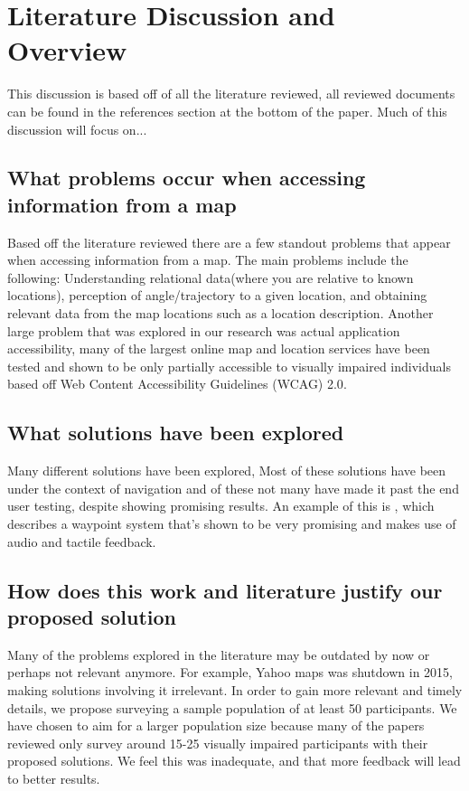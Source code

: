 \documentclass{article}
\begin{document}
\section{Literature Discussion and Overview}
This discussion is based off of all the literature reviewed, all reviewed documents can be found in the references section at the bottom of the paper. Much of this discussion will focus on...

\subsection{What problems occur when accessing information from a map}
Based off the literature reviewed there are a few standout problems that appear when accessing information from a map. The main problems include the following: Understanding relational data(where you are relative to known locations)\cite{10.1145/1168987.1169008}, perception of angle/trajectory to a given location\cite{LAHIB201816}, and obtaining relevant data from the map locations such as a location description. Another large problem that was explored in our research was actual application accessibility, many of the largest online map and location services have been tested and shown to be only partially accessible to visually impaired individuals based off Web Content Accessibility Guidelines (WCAG) 2.0\cite{10.1145/2815169.2815171}.

\subsection{What solutions have been explored}
Many different solutions have been explored, Most of these solutions have been under the context of navigation and of these not many have made it past the end user testing, despite showing promising results. An example of this is \cite{10.1145/2468356.2468364}, which describes a waypoint system that's shown to be very promising and makes use of audio and tactile feedback. 

\subsection{How does this work and literature justify our proposed solution}
Many of the problems explored in the literature may be outdated by now or perhaps not relevant anymore. For example, Yahoo maps was shutdown in 2015, making solutions involving it irrelevant. In order to gain more relevant and timely details, we propose surveying a sample population of at least 50 participants. We have chosen to aim for a larger population size because many of the papers reviewed only survey around 15-25 visually impaired participants with their proposed solutions. We feel this was inadequate, and that more feedback will lead to better results.
\end{document}
